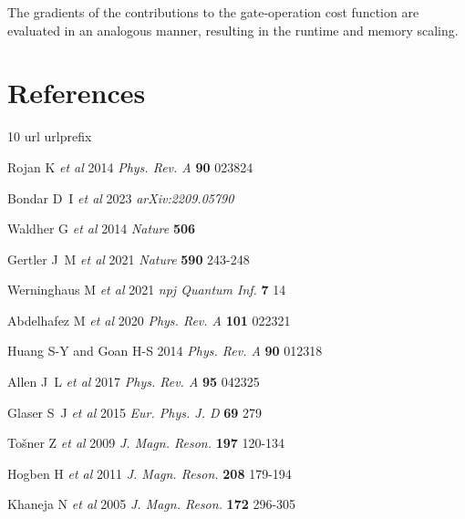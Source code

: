 \documentclass[letterpaper,10pt]{iopart}
\begin{document}
The gradients of the contributions to the gate-operation cost function are evaluated in an analogous manner, resulting in the runtime and memory scaling.





\section*{References}

% 

\providecommand{\newblock}{}
\begin{thebibliography}{10}
\expandafter\ifx\csname url\endcsname\relax
  \def\url#1{{\tt #1}}\fi
\expandafter\ifx\csname urlprefix\endcsname\relax\def\urlprefix{URL }\fi
\providecommand{\eprint}[2][]{\url{#2}}

Rojan K {\em et al\/} 2014 {\em Phys. Rev. A\/} {\bf 90} 023824

Bondar D~I {\em et al\/} 2023 {\em arXiv:2209.05790\/}

Waldher G {\em et al} 2014 {\em Nature\/} {\bf 506}  

Gertler J~M {\em et al\/} 2021 {\em Nature\/} {\bf 590} 243-248  

Werninghaus M {\em et al\/} 2021 {\em npj Quantum Inf.} {\bf 7} 14


Abdelhafez M {\em et al\/} 2020 {\em Phys. Rev. A} {\bf101} 022321 

Huang S-Y and Goan H-S 2014 {\em Phys. Rev. A} {\bf90} 012318 

Allen J~L {\em et al\/} 2017 {\em Phys. Rev. A\/} {\bf95} 042325  

Glaser S~J {\em et al\/} 2015 {\em Eur. Phys. J. D\/} {\bf69} 279

Tošner Z  {\em et al\/} 
2009 
{\em J. Magn. Reson.} 
{\bf197} 120-134 

Hogben H {\em et al\/} 
2011
{\em J. Magn. Reson.} 
{\bf208} 179-194  

Khaneja N {\em et al\/} 
2005
{\em J. Magn. Reson.}  {\bf172} 296-305 


\end{thebibliography}
\end{document}
